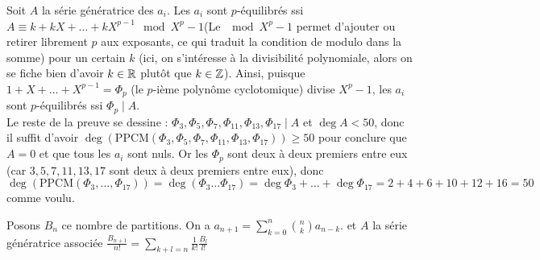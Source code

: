 \begin{sol}
Soit $A$ la série génératrice des $a_i$. Les $a_i$ sont $p$-équilibrés ssi $ A \equiv k + kX + \dots + kX^{p - 1} \mod{X^p - 1}$(Le $\mod{X^p - 1}$ permet d'ajouter ou retirer librement $p$ aux exposants, ce qui traduit la condition de modulo dans la somme) pour un certain $k$ (ici, on s'intéresse à la divisibilité polynomiale, alors on se fiche bien d'avoir $k\in\mathbb R$ plutôt que $k\in\mathbb Z$). Ainsi, puisque
$1 + X + \dots + X^{p - 1} = \Phi_p$ (le $p$-ième polynôme cyclotomique) divise $X^p - 1$, les $a_i$ sont $p$-équilibrés ssi $\Phi_p \mid A$. \\
Le reste de la preuve se dessine : $\Phi_3, \Phi_5, \Phi_7, \Phi_{11}, \Phi_{13}, \Phi_{17} \mid A$ et $\deg A < 50$, donc il suffit d'avoir $\deg(\mathrm{PPCM}(\Phi_3, \Phi_5, \Phi_7, \Phi_{11}, \Phi_{13}, \Phi_{17})) \ge 50$ pour conclure que $A = 0$ et que tous les $a_i$ sont nuls. Or les $\Phi_p$ sont deux à deux premiers entre eux (car $3, 5, 7, 11, 13, 17$ sont deux à deux premiers entre eux), donc
$$\deg(\mathrm{PPCM}(\Phi_3, \dots, \Phi_{17})) = \deg(\Phi_3\dots\Phi_{17})= \deg\Phi_3 + \dots + \deg\Phi_{17} = 2 + 4 + 6 + 10 + 12 + 16 = 50$$
comme voulu.
\end{sol}


\begin{sol}
Posons $B_n$ ce nombre de partitions. On a $a_{n+1} = \sum_{k=0}^n {n \choose k} a_{n - k}$. et $A$ la série génératrice associée
$\frac{B_{n+1}}{n!} = \sum_{k+l=n} \frac 1{k!}\frac{B_l}{l!}$
\end{sol}